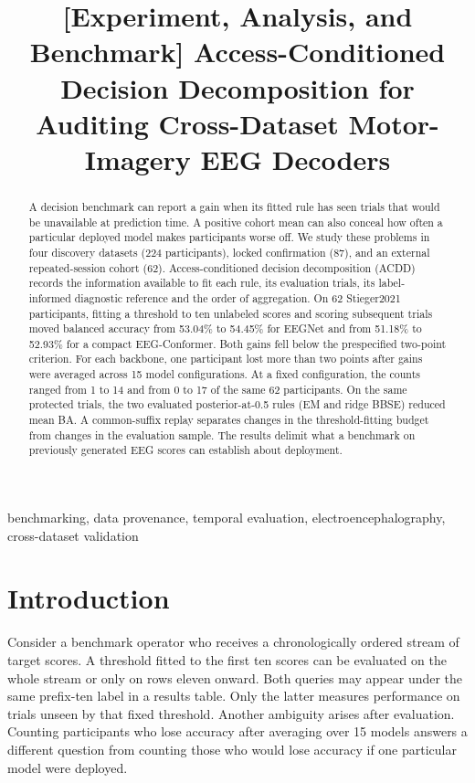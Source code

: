 \documentclass[conference,letterpaper]{IEEEtran}
\title{[Experiment, Analysis, and Benchmark] Access-Conditioned Decision Decomposition for Auditing Cross-Dataset Motor-Imagery EEG Decoders}
\author{\IEEEauthorblockN{Author names and affiliations pending confirmation}}
\begin{document}
\maketitle
\begin{abstract}
A decision benchmark can report a gain when its fitted rule has seen trials that would be unavailable at prediction time. A positive cohort mean can also conceal how often a particular deployed model makes participants worse off. We study these problems in four discovery datasets (224 participants), locked confirmation (87), and an external repeated-session cohort (62). Access-conditioned decision decomposition (ACDD) records the information available to fit each rule, its evaluation trials, its label-informed diagnostic reference and the order of aggregation. On 62 Stieger2021 participants, fitting a threshold to ten unlabeled scores and scoring subsequent trials moved balanced accuracy from 53.04\% to 54.45\% for EEGNet and from 51.18\% to 52.93\% for a compact EEG-Conformer. Both gains fell below the prespecified two-point criterion. For each backbone, one participant lost more than two points after gains were averaged across 15 model configurations. At a fixed configuration, the counts ranged from 1 to 14 and from 0 to 17 of the same 62 participants. On the same protected trials, the two evaluated posterior-at-0.5 rules (EM and ridge BBSE) reduced mean BA. A common-suffix replay separates changes in the threshold-fitting budget from changes in the evaluation sample. The results delimit what a benchmark on previously generated EEG scores can establish about deployment.
\end{abstract}
\begin{IEEEkeywords}
benchmarking, data provenance, temporal evaluation, electroencephalography, cross-dataset validation
\end{IEEEkeywords}
\section{Introduction}\label{sec:intro}
Consider a benchmark operator who receives a chronologically ordered stream of target scores. A threshold fitted to the first ten scores can be evaluated on the whole stream or only on rows eleven onward. Both queries may appear under the same prefix-ten label in a results table. Only the latter measures performance on trials unseen by that fixed threshold. Another ambiguity arises after evaluation. Counting participants who lose accuracy after averaging over 15 models answers a different question from counting those who would lose accuracy if one particular model were deployed.
\end{document}
